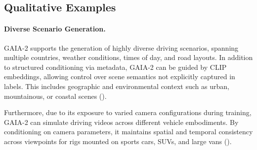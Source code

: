 \subsection{Qualitative Examples}

\paragraph{Diverse Scenario Generation.}
GAIA-2 supports the generation of highly diverse driving scenarios, spanning multiple countries, weather conditions, times of day, and road layouts. In addition to structured conditioning via metadata, GAIA-2 can be guided by CLIP embeddings, allowing control over scene semantics not explicitly captured in labels. This includes geographic and environmental context such as urban, mountainous, or coastal scenes ().

Furthermore, due to its exposure to varied camera configurations during training, GAIA-2 can simulate driving videos across different vehicle embodiments. By conditioning on camera parameters, it maintains spatial and temporal consistency across viewpoints for rigs mounted on sports cars, SUVs, and large vans ().


